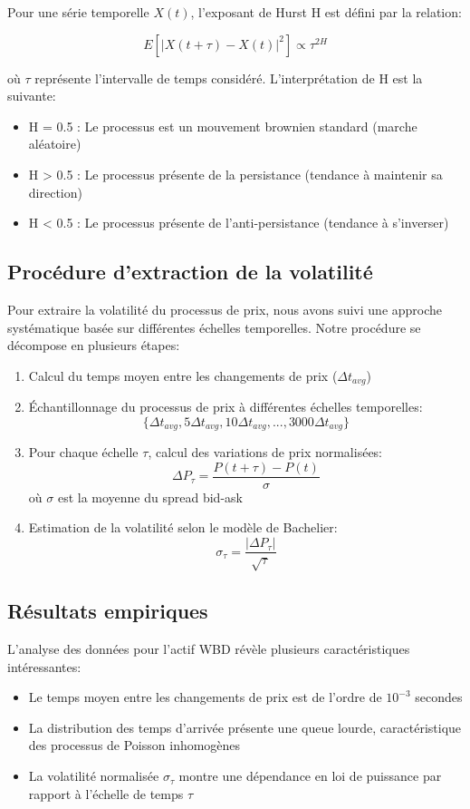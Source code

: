 \documentclass[12pt,a4paper]{article}
\theoremstyle{definition}
\theoremstyle{remark}
\begin{document}
Pour une série temporelle \(X(t)\), l'exposant de Hurst H est défini par la relation:

\[
E[|X(t+\tau) - X(t)|^2] \propto \tau^{2H}
\]

où \(\tau\) représente l'intervalle de temps considéré. L'interprétation de H est la suivante:
\begin{itemize}
    \item H = 0.5 : Le processus est un mouvement brownien standard (marche aléatoire)
    \item H > 0.5 : Le processus présente de la persistance (tendance à maintenir sa direction)
    \item H < 0.5 : Le processus présente de l'anti-persistance (tendance à s'inverser)
\end{itemize}

\subsection{Procédure d'extraction de la volatilité}

Pour extraire la volatilité du processus de prix, nous avons suivi une approche systématique basée sur différentes échelles temporelles. Notre procédure se décompose en plusieurs étapes:

\begin{enumerate}
    \item Calcul du temps moyen entre les changements de prix (\(\Delta t_{avg}\))
    \item Échantillonnage du processus de prix à différentes échelles temporelles:
    \[\{\Delta t_{avg}, 5\Delta t_{avg}, 10\Delta t_{avg}, ..., 3000\Delta t_{avg}\}\]
    \item Pour chaque échelle \(\tau\), calcul des variations de prix normalisées:
    \[\Delta P_{\tau} = \frac{P(t+\tau) - P(t)}{\sigma}\]
    où \(\sigma\) est la moyenne du spread bid-ask
    \item Estimation de la volatilité selon le modèle de Bachelier:
    \[\sigma_{\tau} = \frac{|\Delta P_{\tau}|}{\sqrt{\tau}}\]
\end{enumerate}

\subsection{Résultats empiriques}

L'analyse des données pour l'actif WBD révèle plusieurs caractéristiques intéressantes:

\begin{itemize}
    \item Le temps moyen entre les changements de prix est de l'ordre de \(10^{-3}\) secondes
    \item La distribution des temps d'arrivée présente une queue lourde, caractéristique des processus de Poisson inhomogènes
    \item La volatilité normalisée \(\sigma_{\tau}\) montre une dépendance en loi de puissance par rapport à l'échelle de temps \(\tau\)
\end{itemize}
\end{document}
